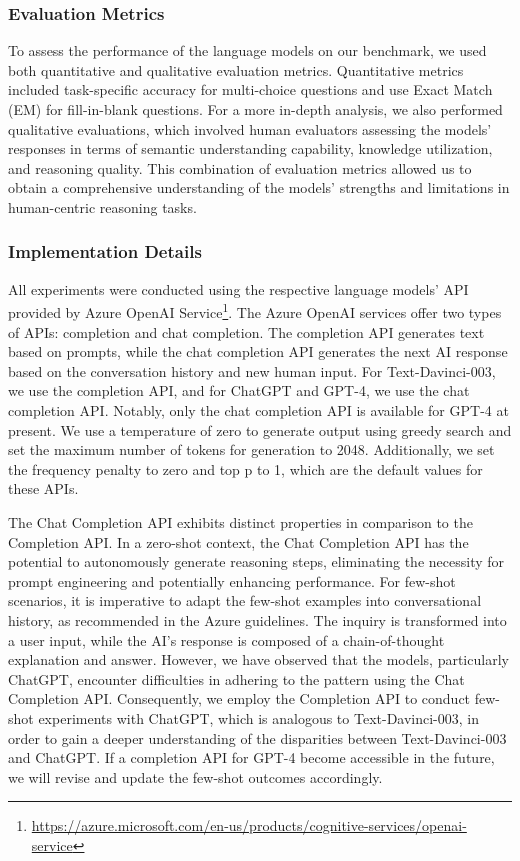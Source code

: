 \subsubsection{Evaluation Metrics} To assess the performance of the language models on our benchmark, we used both quantitative and qualitative evaluation metrics. Quantitative metrics included task-specific accuracy for multi-choice questions and use Exact Match (EM) for fill-in-blank questions. For a more in-depth analysis, we also performed qualitative evaluations, which involved human evaluators assessing the models' responses in terms of semantic understanding capability, knowledge utilization, and reasoning quality. This combination of evaluation metrics allowed us to obtain a comprehensive understanding of the models' strengths and limitations in human-centric reasoning tasks.

\subsubsection{Implementation Details} All experiments were conducted using the respective language models' API provided by Azure OpenAI Service\footnote{\url{https://azure.microsoft.com/en-us/products/cognitive-services/openai-service}}. The Azure OpenAI services offer two types of APIs: completion and chat completion. The completion API generates text based on prompts, while the chat completion API generates the next AI response based on the conversation history and new human input. For Text-Davinci-003, we use the completion API, and for ChatGPT and GPT-4, we use the chat completion API. Notably, only the chat completion API is available for GPT-4 at present. We use a temperature of zero to generate output using greedy search and set the maximum number of tokens for generation to 2048. Additionally, we set the frequency penalty to zero and top p to 1, which are the default values for these APIs.

The Chat Completion API exhibits distinct properties in comparison to the Completion API. In a zero-shot context, the Chat Completion API has the potential to autonomously generate reasoning steps, eliminating the necessity for prompt engineering and potentially enhancing performance. For few-shot scenarios, it is imperative to adapt the few-shot examples into conversational history, as recommended in the Azure guidelines. The inquiry is transformed into a user input, while the AI's response is composed of a chain-of-thought explanation and answer. However, we have observed that the models, particularly ChatGPT, encounter difficulties in adhering to the pattern using the Chat Completion API. Consequently, we employ the Completion API to conduct few-shot experiments with ChatGPT, which is analogous to Text-Davinci-003, in order to gain a deeper understanding of the disparities between Text-Davinci-003 and ChatGPT. If a completion API for GPT-4 become accessible in the future, we will revise and update the few-shot outcomes accordingly.

